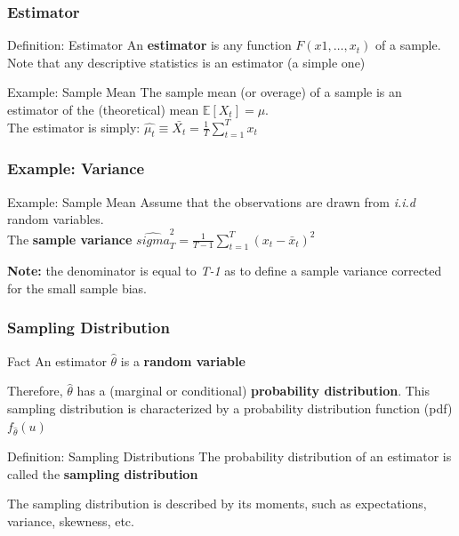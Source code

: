 \documentclass{beamer}
\begin{document}
\begin{frame}
  \frametitle{Estimator}

  \begin{block}{Definition: Estimator}
    An \textbf{estimator} is any function $F(x1, \dots, x_t)$ of a sample. Note that any descriptive statistics is an estimator (a simple one) 
  \end{block}


  \begin{exampleblock}{Example: Sample Mean}
    The sample mean (or overage) of a sample is an estimator of the (theoretical) mean $ \mathbb{E}[X_t] = \mu$.\\
    The estimator is simply: $\hat{\mu_t} \equiv \bar{X_t} = \frac{1}{T} \sum_{t=1}^{T}x_t$
  \end{exampleblock}
  
\end{frame}


\begin{frame}
  \frametitle{Example: Variance}

  \begin{exampleblock}{Example: Sample Mean}
    Assume that the observations are drawn from \emph{i.i.d} random variables.\\
    The \textbf{sample variance} $\hat{sigma}^2_T = \frac{1}{T-1} \sum_{t=1}^T (x_t - \bar{x}_t)^2$
  \end{exampleblock}

\textbf{Note:} the denominator is equal to \emph{T-1} as to define a sample variance corrected for the small sample bias. 
  
\end{frame}



\begin{frame}
  \frametitle{Sampling Distribution}

  \begin{block}{Fact}
    An estimator $\hat{\theta}$ is a \textbf{random variable}
  \end{block}
  Therefore, $\hat{\theta}$ has a (marginal or conditional) \textbf{probability distribution}. This sampling distribution is characterized by a probability distribution function (pdf) $f_{\hat{\theta}}(u)$

  \begin{block}{Definition: Sampling Distributions}
    The probability distribution of an estimator is called the \textbf{sampling distribution}
  \end{block}
  The sampling distribution is described by its moments, such as expectations, variance, skewness, etc.
  \end{frame}
\end{document}
